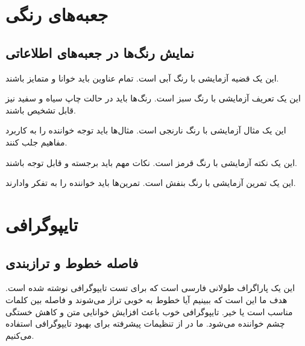 \documentclass{matinbook}
\begin{document}
\chapter{جعبه‌های رنگی}

\section{نمایش رنگ‌ها در جعبه‌های اطلاعاتی}

\begin{theorem}
    این یک قضیه آزمایشی با رنگ آبی است.
    تمام عناوین باید خوانا و متمایز باشند.
\end{theorem}

\begin{definition}
    این یک تعریف آزمایشی با رنگ سبز است.
    رنگ‌ها باید در حالت چاپ سیاه و سفید نیز قابل تشخیص باشند.
\end{definition}

\begin{example}
    این یک مثال آزمایشی با رنگ نارنجی است.
    مثال‌ها باید توجه خواننده را به کاربرد مفاهیم جلب کنند.
\end{example}

\begin{remark}
    این یک نکته آزمایشی با رنگ قرمز است.
    نکات مهم باید برجسته و قابل توجه باشند.
\end{remark}

\begin{exercise}
    این یک تمرین آزمایشی با رنگ بنفش است.
    تمرین‌ها باید خواننده را به تفکر وادارند.
\end{exercise}

\chapter{تایپوگرافی}

\section{فاصله خطوط و ترازبندی}

این یک پاراگراف طولانی فارسی است که برای تست تایپوگرافی نوشته شده است.
هدف ما این است که ببینیم آیا خطوط به خوبی تراز می‌شوند و فاصله بین
کلمات مناسب است یا خیر. تایپوگرافی خوب باعث افزایش خوانایی متن
و کاهش خستگی چشم خواننده می‌شود. ما در  از تنظیمات
پیشرفته  برای بهبود تایپوگرافی استفاده می‌کنیم.
\end{document}
